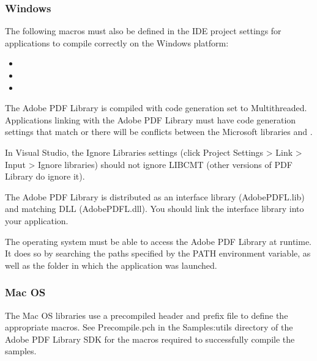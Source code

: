 \documentclass[letterpaper,12pt,english,openany,oneside]{sphinxmanual}
\begin{document}
\subsubsection{Windows}
\label{\detokenize{Plugins_CreatingSimplePlug:windows}}
The following macros must also be defined in the IDE project settings for applications to compile correctly on the Windows platform:
\begin{itemize}
\item {} 

\item {} 

\item {} 

\end{itemize}

The Adobe PDF Library is compiled with code generation set to Multithreaded. Applications linking with the Adobe PDF Library must have code generation settings that match or there will be conflicts between the Microsoft libraries  and .

In Visual Studio, the Ignore Libraries settings (click Project Settings > Link > Input > Ignore libraries) should not ignore LIBCMT (other versions of PDF Library do ignore it).

The Adobe PDF Library is distributed as an interface library (AdobePDFL.lib) and matching DLL (AdobePDFL.dll). You should link the interface library into your application.

The operating system must be able to access the Adobe PDF Library at runtime. It does so by searching the paths specified by the PATH environment variable, as well as the folder in which the application was launched.


\subsubsection{Mac OS}
\label{\detokenize{Plugins_CreatingSimplePlug:mac-os}}
The Mac OS libraries use a precompiled header and prefix file to define the appropriate macros. See Precompile.pch in the Samples:utils directory of the Adobe PDF Library SDK for the macros required to successfully compile the samples.
\end{document}
